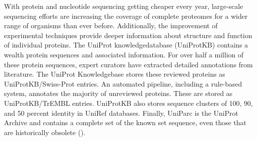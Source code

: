 With protein and nucleotide sequencing getting cheaper every year,
large-scale sequencing efforts are increasing the coverage of complete proteomes for a wider range of organisms than ever before. 
Additionally, the improvement of experimental techniques provide deeper information about structure and function of individual proteins.
The UniProt knowledgedatabase (UniProtKB) contains a wealth protein sequences and associated information.
For over half a million of these protein sequences,
expert curators have extracted detailed annotations from literature.
The UniProt Knowledgebase stores these reviewed proteins as UniProtKB/Swiss-Prot entries.
An automated pipeline, including a rule-based system, annotates the majority of unreviewed proteins.
These are stored as UniProtKB/TrEMBL entries.
UniProtKB also stores sequence clusters of 100, 90, and 50 percent identity in UniRef databases.
Finally, UniParc is the UniProt Archive and contains a complete set of the known set sequence, even those that are historically obsolete 
(\cite{uniprot2019}).
